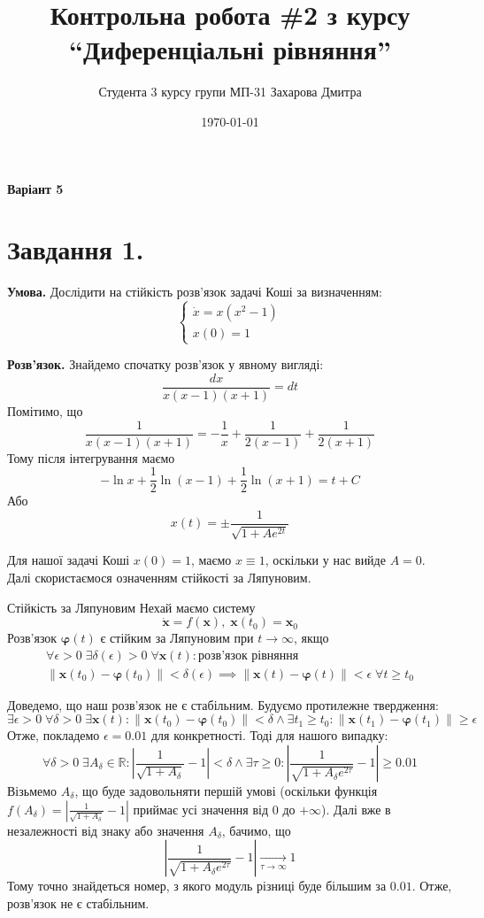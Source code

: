 \documentclass[14pt]{extarticle}
\title{Контрольна робота \#2 з курсу ``Диференціальні рівняння''}
\author{Студента 3 курсу групи МП-31 Захарова Дмитра}
\date{\today}
\begin{document}
\maketitle

\begin{center}
    \textbf{Варіант 5}
\end{center}

\section*{Завдання 1.} 

\textbf{Умова.} Дослідити на стійкість розв'язок задачі Коші за визначенням:
\[
\begin{cases}
    \dot{x} = x(x^2-1) \\
    x(0) = 1
\end{cases}
\]

\textbf{Розв'язок.} Знайдемо спочатку розв'язок у явному вигляді:
\[
\frac{dx}{x(x-1)(x+1)} = dt
\]
Помітимо, що
\[
\frac{1}{x(x-1)(x+1)} = -\frac{1}{x} + \frac{1}{2(x-1)} + \frac{1}{2(x+1)}
\]
Тому після інтегрування маємо
\[
-\ln x + \frac{1}{2}\ln (x-1) + \frac{1}{2}\ln (x+1) = t + C
\]
Або
\[
\boxed{x(t) = \pm\frac{1}{\sqrt{1+Ae^{2t}}}}
\]

Для нашої задачі Коші $x(0)=1$, маємо $x \equiv 1$, оскільки у нас вийде $A=0$. Далі скористаємося означенням стійкості за Ляпуновим. 

\begin{def*}{Стійкість за Ляпуновим}
Нехай маємо систему 
\[
\dot{\mathbf{x}}=f(\mathbf{x}),\;\mathbf{x}(t_0)=\mathbf{x}_0
\]
Розв'язок $\boldsymbol{\varphi}(t)$ є стійким за Ляпуновим при $t \to \infty$, якщо
\begin{gather*}
\forall \epsilon > 0 \; \exists \delta(\epsilon) > 0 \; \forall \mathbf{x}(t): \text{розв'язок рівняння} \\ \|\mathbf{x}(t_0)-\boldsymbol{\varphi}(t_0)\| < \delta(\epsilon) \implies \|\mathbf{x}(t)-\boldsymbol{\varphi}(t)\| < \epsilon \; \forall t \geq t_0
\end{gather*}
\end{def*}

Доведемо, що наш розв'язок не є стабільним. Будуємо протилежне твердження:
\[
\exists \epsilon > 0 \; \forall \delta > 0 \; \exists \mathbf{x}(t): \|\mathbf{x}(t_0)-\boldsymbol{\varphi}(t_0)\| < \delta \wedge \exists t_1 \geq t_0: \|\boldsymbol{x}(t_1) - \boldsymbol{\varphi}(t_1)\| \geq \epsilon
\]
Отже, покладемо $\epsilon = 0.01$ для конкретності. Тоді для нашого випадку:
\[
\forall \delta > 0 \; \exists A_{\delta} \in \mathbb{R}: \left|\frac{1}{\sqrt{1+A_{\delta}}}-1\right| < \delta \wedge \exists \tau \geq 0: \left|\frac{1}{\sqrt{1+A_{\delta}e^{2\tau}}}-1\right| \geq 0.01
\]
Візьмемо $A_{\delta}$, що буде задовольняти першій умові (оскільки функція $f(A_{\delta})=\left|\frac{1}{\sqrt{1+A_{\delta}}}-1\right|$ приймає усі значення від $0$ до $+\infty$). Далі вже в незалежності від знаку або значення $A_{\delta}$, бачимо, що
\[
\left|\frac{1}{\sqrt{1+A_{\delta}e^{2\tau}}}-1\right| \xrightarrow[\tau \to \infty]{}1
\]
Тому точно знайдеться номер, з якого модуль різниці буде більшим за $0.01$. Отже, розв'язок не є стабільним.
\end{document}
